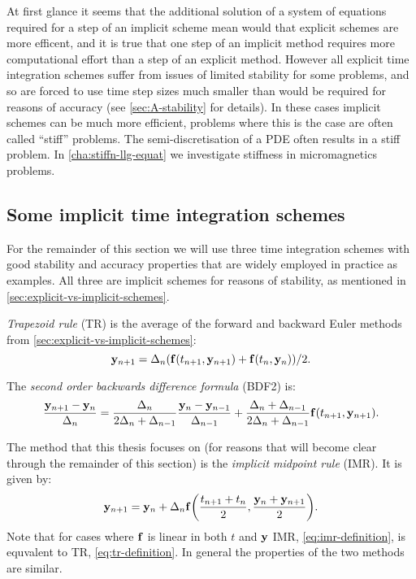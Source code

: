 At first glance it seems that the additional solution of a system of equations required for a step of an implicit scheme mean would that explicit schemes are more efficent, and it is true that one step of an implicit method requires more computational effort than a step of an explicit method.
However all explicit time integration schemes suffer from issues of limited stability for some problems, and so are forced to use time step sizes much smaller than would be required for reasons of accuracy (see \cref{sec:A-stability} for details).
In these cases implicit schemes can be much more efficient, problems where this is the case are often called ``stiff'' problems.
The semi-discretisation of a PDE often results in a stiff problem.
In \cref{cha:stiffn-llg-equat} we investigate stiffness in micromagnetics problems.




\subsection{Some implicit time integration schemes}
\label{sec:some-implicit-time-integrators}

For the remainder of this section we will use three time integration schemes with good stability and accuracy properties that are widely employed in practice as examples.
All three are implicit schemes for reasons of stability, as mentioned in \cref{sec:explicit-vs-implicit-schemes}.

\emph{Trapezoid rule} (TR) is the average of the forward and backward Euler methods from \cref{sec:explicit-vs-implicit-schemes}:
\begin{equation}
  \mathbf{y}_{n+1} = \Delta_{n} ({\mathbf{f}{\left( t_{n+1}, \mathbf{y}_{n+1} \right)}} + {\mathbf{f}{\left( t_n, \mathbf{y}_n \right)}})/2.
  \label{eq:tr-definition}
\end{equation}

The \emph{second order backwards difference formula} (BDF2) is:
\begin{equation}
  \frac{\mathbf{y}_{n+1} - \mathbf{y}_n}{\Delta_{n}} = \frac{\Delta_{n}}{2\Delta_{n} + \Delta_{n-1}} \frac{\mathbf{y}_n - \mathbf{y}_{n-1}}{\Delta_{n-1}} 
  + \frac{\Delta_{n} + \Delta_{n-1}}{2\Delta_{n} + \Delta_{n-1}} {\mathbf{f}}(t_{n+1}, \mathbf{y}_{n+1}).
\end{equation}

The method that this thesis focuses on (for reasons that will become clear through the remainder of this section) is the \emph{implicit midpoint rule} (IMR).
It is given by:
\begin{equation}
  \label{eq:imr-definition}
  \mathbf{y}_{n+1} = \mathbf{y}_n + \Delta_{n} {\mathbf{f}{\left( \frac{t_{n+1} + t_n}{2}, \frac{\mathbf{y}_n + \mathbf{y}_{n+1}}{2} \right)}}.
\end{equation}
Note that for cases where ${\mathbf{f}}$ is linear in both $t$ and $\mathbf{y}$ IMR, \cref{eq:imr-definition}, is equvalent to TR, \cref{eq:tr-definition}.
In general the properties of the two methods are similar.

